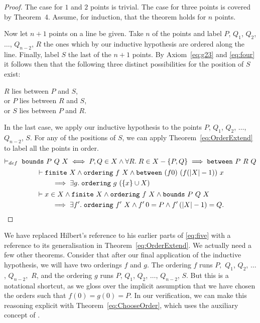 \begin{proof}
The case for $1$ and $2$ points is trivial. The case for three points is covered by Theorem~4. Assume, for induction, that the theorem holds for $n$ points.

Now let $n+1$ points on a line be given. Take $n$ of the points and label $P$, $Q_1$, $Q_2$, $\ldots$, $Q_{n-2}$, $R$ the ones which by our inductive hypothesis are ordered along the line. Finally, label $S$ the last of the $n+1$ points. By Axiom~\ref{eq:g23} and \ref{eq:four} it follows then that the following three distinct possibilities for the position of $S$ exist:

\vspace{0.5cm}
\noindent $R$ lies between $P$ and $S$,\\
\noindent or $P$ lies between $R$ and $S$,\\
\noindent or $S$ lies between $P$ and $R$.
\vspace{0.5cm}

In the last case, we apply our inductive hypothesis to the points $P$, $Q_1$, $Q_2$, $\ldots$, $Q_{n-2}$, $S$. For any of the positions of $S$, we can apply Theorem~\ref{eq:OrderExtend} to label all the points in order.
\begin{gather}
  \vdash_{def}\; \code{bounds}\ P\ Q\ X \iff P,Q \in X \wedge \forall R.\; R \in X - \{P,Q\} \implies \between{P}{R}{Q}\notag\\
  \begin{aligned}  \label{eq:OrderExtend}
    &\vdash\code{finite}\ X \wedge \code{ordering}\ f\ X \wedge \between{(f 0)}{(f (|X| - 1))}{x}\\
    &\qquad \implies \exists g.\; \code{ordering}\ g\ (\{x\} \cup X)
  \end{aligned}\\
  \begin{aligned}  \label{eq:ChooseOrder}
    &\vdash x \in X \wedge \code{finite}\ X \wedge \code{ordering}\ f\ X \wedge \code{bounds}\ P\ Q\ X\\
    &\qquad\implies\exists f'.\; \code{ordering}\ f'\ X \wedge f'\,0 = P \wedge f'\,(|X| - 1) = Q.
  \end{aligned}
\end{gather}

\end{proof}
We have replaced Hilbert's reference to his earlier parts of \ref{eq:five} with a reference to its generalisation in Theorem~\ref{eq:OrderExtend}. We actually need a few other theorems. Consider that after our final application of the inductive hypothesis, we will have two orderings $f$ and $g$. The ordering $f$ runs $P,$ $Q_1$, $Q_2$, $\ldots$, $Q_{n-2},$ $R$, and the ordering $g$ runs $P$, $Q_1$, $Q_2$, $\ldots$, $Q_{n-2}$, $S$. But this is a notational shortcut, as we gloss over the implicit assumption that we have chosen the orders such that $f(0) = g(0) = P$. In our verification, we can make this reasoning explicit with Theorem~\ref{eq:ChooseOrder}, which uses the auxiliary concept of . 


